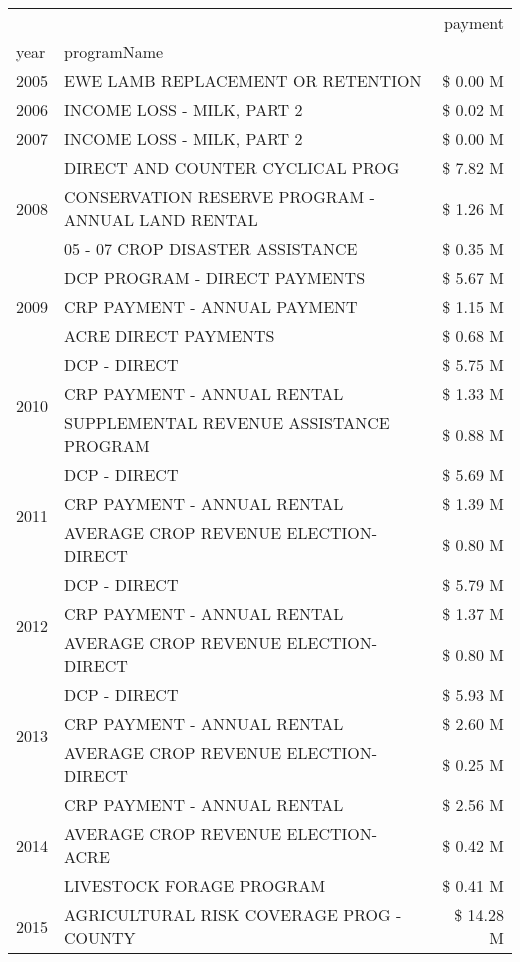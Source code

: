 \begin{tabular}{llr}
\toprule
 &  & payment \\
year & programName &  \\
\midrule
2005 & EWE LAMB REPLACEMENT OR RETENTION & \$ 0.00 M \\
\cline{1-3}
2006 & INCOME LOSS - MILK, PART 2 & \$ 0.02 M \\
\cline{1-3}
2007 & INCOME LOSS - MILK, PART 2 & \$ 0.00 M \\
\cline{1-3}
\multirow[t]{3}{*}{2008} & DIRECT AND COUNTER CYCLICAL PROG & \$ 7.82 M \\
 & CONSERVATION RESERVE PROGRAM - ANNUAL LAND RENTAL & \$ 1.26 M \\
 & 05 - 07 CROP DISASTER ASSISTANCE & \$ 0.35 M \\
\cline{1-3}
\multirow[t]{3}{*}{2009} & DCP PROGRAM - DIRECT PAYMENTS & \$ 5.67 M \\
 & CRP PAYMENT - ANNUAL PAYMENT & \$ 1.15 M \\
 & ACRE DIRECT PAYMENTS & \$ 0.68 M \\
\cline{1-3}
\multirow[t]{3}{*}{2010} & DCP - DIRECT & \$ 5.75 M \\
 & CRP PAYMENT - ANNUAL RENTAL & \$ 1.33 M \\
 & SUPPLEMENTAL REVENUE ASSISTANCE PROGRAM & \$ 0.88 M \\
\cline{1-3}
\multirow[t]{3}{*}{2011} & DCP - DIRECT & \$ 5.69 M \\
 & CRP PAYMENT - ANNUAL RENTAL & \$ 1.39 M \\
 & AVERAGE CROP REVENUE ELECTION-DIRECT & \$ 0.80 M \\
\cline{1-3}
\multirow[t]{3}{*}{2012} & DCP - DIRECT & \$ 5.79 M \\
 & CRP PAYMENT - ANNUAL RENTAL & \$ 1.37 M \\
 & AVERAGE CROP REVENUE ELECTION-DIRECT & \$ 0.80 M \\
\cline{1-3}
\multirow[t]{3}{*}{2013} & DCP - DIRECT & \$ 5.93 M \\
 & CRP PAYMENT - ANNUAL RENTAL & \$ 2.60 M \\
 & AVERAGE CROP REVENUE ELECTION-DIRECT & \$ 0.25 M \\
\cline{1-3}
\multirow[t]{3}{*}{2014} & CRP PAYMENT - ANNUAL RENTAL & \$ 2.56 M \\
 & AVERAGE CROP REVENUE ELECTION-ACRE & \$ 0.42 M \\
 & LIVESTOCK FORAGE PROGRAM & \$ 0.41 M \\
\cline{1-3}
\multirow[t]{3}{*}{2015} & AGRICULTURAL RISK COVERAGE PROG - COUNTY & \$ 14.28 M \\

\end{tabular}
